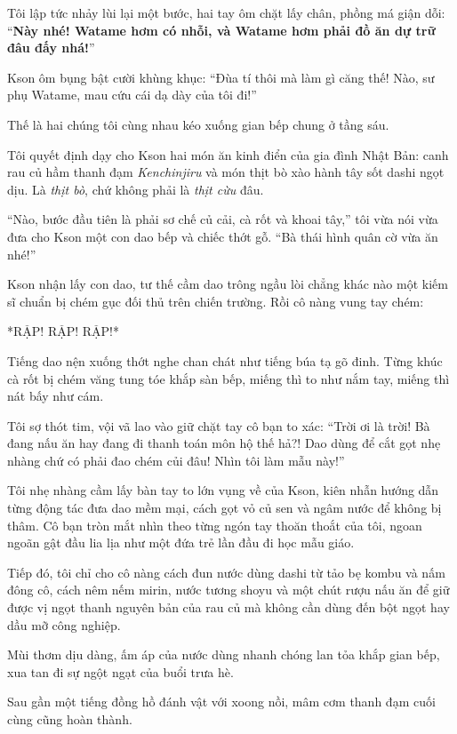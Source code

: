 \documentclass[../main.tex]{subfiles}
\begin{document}
Tôi lập tức nhảy lùi lại một bước, hai tay ôm chặt lấy chân, phồng má giận dỗi: ``\textbf{Này nhé! Watame hơm có nhỗi, và Watame hơm phải đồ ăn dự trữ đâu đấy nhá!}''

Kson ôm bụng bật cười khùng khục: ``Đùa tí thôi mà làm gì căng thế! Nào, sư phụ Watame, mau cứu cái dạ dày của tôi đi!''

\ct

Thế là hai chúng tôi cùng nhau kéo xuống gian bếp chung ở tầng sáu.

Tôi quyết định dạy cho Kson hai món ăn kinh điển của gia đình Nhật Bản: canh rau củ hầm thanh đạm \textit{Kenchinjiru} và món thịt bò xào hành tây sốt dashi ngọt dịu. Là \emph{thịt bò}, chứ không phải là \emph{thịt cừu} đâu.

``Nào, bước đầu tiên là phải sơ chế củ cải, cà rốt và khoai tây,'' tôi vừa nói vừa đưa cho Kson một con dao bếp và chiếc thớt gỗ. ``Bà thái hình quân cờ vừa ăn nhé!''

Kson nhận lấy con dao, tư thế cầm dao trông ngầu lòi chẳng khác nào một kiếm sĩ chuẩn bị chém gục đối thủ trên chiến trường. Rồi cô nàng vung tay chém:

*RẬP! RẬP! RẬP!*

Tiếng dao nện xuống thớt nghe chan chát như tiếng búa tạ gõ đinh. Từng khúc cà rốt bị chém văng tung tóe khắp sàn bếp, miếng thì to như nắm tay, miếng thì nát bấy như cám.

Tôi sợ thót tim, vội vã lao vào giữ chặt tay cô bạn to xác: ``Trời ơi là trời! Bà đang nấu ăn hay đang đi thanh toán môn hộ thế hả?! Dao dùng để cắt gọt nhẹ nhàng chứ có phải đao chém củi đâu! Nhìn tôi làm mẫu này!''

Tôi nhẹ nhàng cầm lấy bàn tay to lớn vụng về của Kson, kiên nhẫn hướng dẫn từng động tác đưa dao mềm mại, cách gọt vỏ củ sen và ngâm nước để không bị thâm. Cô bạn tròn mắt nhìn theo từng ngón tay thoăn thoắt của tôi, ngoan ngoãn gật đầu lia lịa như một đứa trẻ lần đầu đi học mẫu giáo.

Tiếp đó, tôi chỉ cho cô nàng cách đun nước dùng dashi từ tảo bẹ kombu và nấm đông cô, cách nêm nếm mirin, nước tương shoyu và một chút rượu nấu ăn để giữ được vị ngọt thanh nguyên bản của rau củ mà không cần dùng đến bột ngọt hay dầu mỡ công nghiệp.

Mùi thơm dịu dàng, ấm áp của nước dùng nhanh chóng lan tỏa khắp gian bếp, xua tan đi sự ngột ngạt của buổi trưa hè.

Sau gần một tiếng đồng hồ đánh vật với xoong nồi, mâm cơm thanh đạm cuối cùng cũng hoàn thành.
\end{document}
